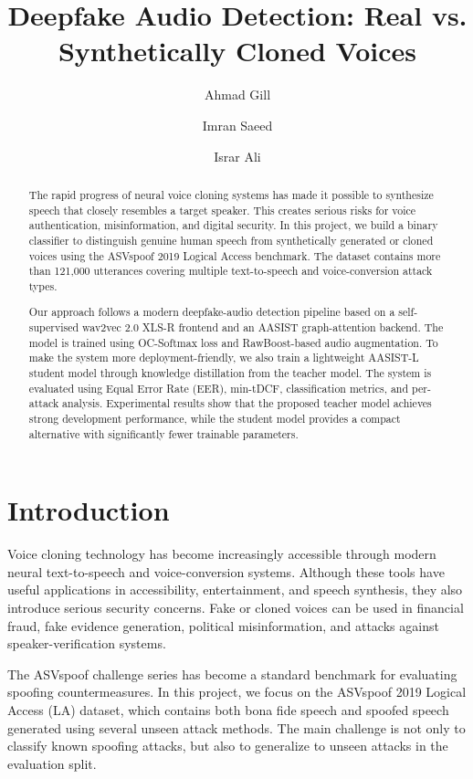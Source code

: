 \documentclass[sigconf]{acmart}
\title{Deepfake Audio Detection: Real vs. Synthetically Cloned Voices}
\author{Ahmad Gill}
\affiliation{
  \institution{AI-600 Deep Learning, Spring 2026}
}
\author{Imran Saeed}
\affiliation{
  \institution{AI-600 Deep Learning, Spring 2026}
}
\author{Israr Ali}
\affiliation{
  \institution{AI-600 Deep Learning, Spring 2026}
}
\begin{document}
\begin{abstract}
The rapid progress of neural voice cloning systems has made it possible to synthesize speech that closely resembles a target speaker. This creates serious risks for voice authentication, misinformation, and digital security. In this project, we build a binary classifier to distinguish genuine human speech from synthetically generated or cloned voices using the ASVspoof 2019 Logical Access benchmark. The dataset contains more than 121,000 utterances covering multiple text-to-speech and voice-conversion attack types.

Our approach follows a modern deepfake-audio detection pipeline based on a self-supervised wav2vec 2.0 XLS-R frontend and an AASIST graph-attention backend. The model is trained using OC-Softmax loss and RawBoost-based audio augmentation. To make the system more deployment-friendly, we also train a lightweight AASIST-L student model through knowledge distillation from the teacher model. The system is evaluated using Equal Error Rate (EER), min-tDCF, classification metrics, and per-attack analysis. Experimental results show that the proposed teacher model achieves strong development performance, while the student model provides a compact alternative with significantly fewer trainable parameters.
\end{abstract}


\maketitle

\section{Introduction}

Voice cloning technology has become increasingly accessible through modern neural text-to-speech and voice-conversion systems. Although these tools have useful applications in accessibility, entertainment, and speech synthesis, they also introduce serious security concerns. Fake or cloned voices can be used in financial fraud, fake evidence generation, political misinformation, and attacks against speaker-verification systems.

The ASVspoof challenge series has become a standard benchmark for evaluating spoofing countermeasures. In this project, we focus on the ASVspoof 2019 Logical Access (LA) dataset, which contains both bona fide speech and spoofed speech generated using several unseen attack methods. The main challenge is not only to classify known spoofing attacks, but also to generalize to unseen attacks in the evaluation split.
\end{document}
